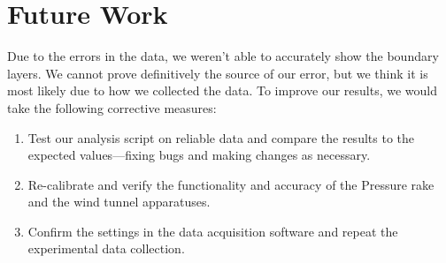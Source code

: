 \section{Future Work} \label{sec:FutureWork}

Due to the errors in the data, we weren't able to accurately show the boundary layers. We cannot prove definitively the source
of our error, but we think it is most likely due to how we collected the data. To improve our results, we would take the following corrective measures:

\begin{enumerate}
    \item Test our analysis script on reliable data and compare the results to the expected values—fixing bugs and making changes as necessary.
    \item Re-calibrate and verify the functionality and accuracy of the Pressure rake and the wind tunnel apparatuses.
    \item Confirm the settings in the data acquisition software and repeat the experimental data collection.
\end{enumerate}